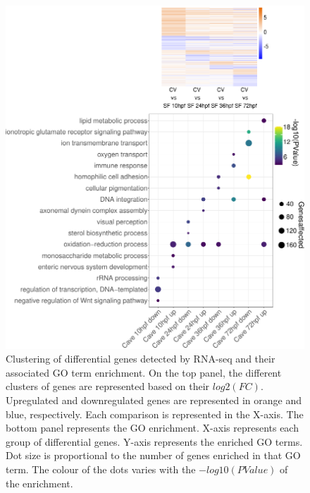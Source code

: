 \begin{figure}[hp]
\centering
\includegraphics[width=1\textwidth]{Figures/astyanax/Diff_genes_clustering}
\caption[Clustering of genes between surfacefish and Cavefish]{Clustering of differential genes detected by RNA-seq and their associated GO term enrichment. On the top panel, the different clusters of genes are represented based on their $log2(FC)$. Upregulated and downregulated genes are represented in orange and blue, respectively. Each comparison is represented in the X-axis. The bottom panel represents the GO enrichment. X-axis represents each group of differential genes. Y-axis represents the enriched GO terms. Dot size is proportional to the number of genes enriched in that GO term. The colour of the dots varies with the $-log10(PValue)$ of the enrichment.}
\label{fig:ast_gene_clustering}
\end{figure}


